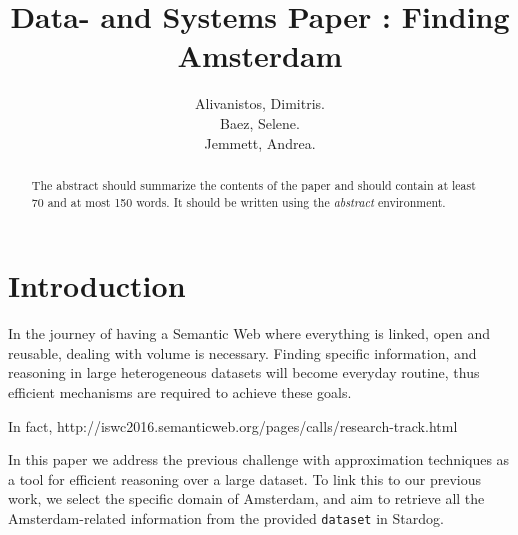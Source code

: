 \documentclass[runningheads,a4paper]{../../StyleFiles/llncs}
\begin{document}
\mainmatter  %

\title{Data- and Systems Paper : Finding Amsterdam}


%
%
\author{Alivanistos, Dimitris. \\ Baez, Selene. \\ Jemmett, Andrea. }
%


\maketitle


\begin{abstract}
The abstract should summarize the contents of the paper and should
contain at least 70 and at most 150 words. It should be written using the
\emph{abstract} environment.
\end{abstract}


\section{Introduction}
In the journey of having a Semantic Web where everything is linked, open and reusable, dealing with volume is necessary. Finding specific information, and reasoning in large heterogeneous datasets will become everyday routine, thus efficient mechanisms are required to achieve these goals. 

In fact, http://iswc2016.semanticweb.org/pages/calls/research-track.html

In this paper we address the previous challenge with approximation techniques as a tool for efficient reasoning over a large dataset. To link this to our previous work, we select the specific domain of Amsterdam, and aim to retrieve all the Amsterdam-related information from the provided \texttt{dataset} in Stardog.  
\end{document}
